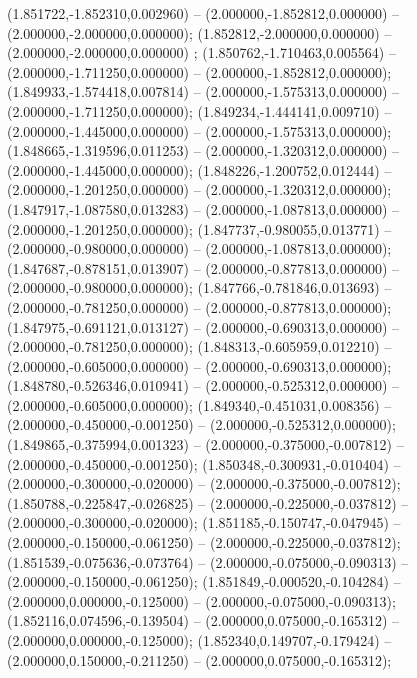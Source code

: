  (1.851722,-1.852310,0.002960) -- (2.000000,-1.852812,0.000000) -- (2.000000,-2.000000,0.000000);
 (1.852812,-2.000000,0.000000) -- (2.000000,-2.000000,0.000000) ;
 (1.850762,-1.710463,0.005564) -- (2.000000,-1.711250,0.000000) -- (2.000000,-1.852812,0.000000);
 (1.849933,-1.574418,0.007814) -- (2.000000,-1.575313,0.000000) -- (2.000000,-1.711250,0.000000);
 (1.849234,-1.444141,0.009710) -- (2.000000,-1.445000,0.000000) -- (2.000000,-1.575313,0.000000);
 (1.848665,-1.319596,0.011253) -- (2.000000,-1.320312,0.000000) -- (2.000000,-1.445000,0.000000);
 (1.848226,-1.200752,0.012444) -- (2.000000,-1.201250,0.000000) -- (2.000000,-1.320312,0.000000);
 (1.847917,-1.087580,0.013283) -- (2.000000,-1.087813,0.000000) -- (2.000000,-1.201250,0.000000);
 (1.847737,-0.980055,0.013771) -- (2.000000,-0.980000,0.000000) -- (2.000000,-1.087813,0.000000);
 (1.847687,-0.878151,0.013907) -- (2.000000,-0.877813,0.000000) -- (2.000000,-0.980000,0.000000);
 (1.847766,-0.781846,0.013693) -- (2.000000,-0.781250,0.000000) -- (2.000000,-0.877813,0.000000);
 (1.847975,-0.691121,0.013127) -- (2.000000,-0.690313,0.000000) -- (2.000000,-0.781250,0.000000);
 (1.848313,-0.605959,0.012210) -- (2.000000,-0.605000,0.000000) -- (2.000000,-0.690313,0.000000);
 (1.848780,-0.526346,0.010941) -- (2.000000,-0.525312,0.000000) -- (2.000000,-0.605000,0.000000);
 (1.849340,-0.451031,0.008356) -- (2.000000,-0.450000,-0.001250) -- (2.000000,-0.525312,0.000000);
 (1.849865,-0.375994,0.001323) -- (2.000000,-0.375000,-0.007812) -- (2.000000,-0.450000,-0.001250);
 (1.850348,-0.300931,-0.010404) -- (2.000000,-0.300000,-0.020000) -- (2.000000,-0.375000,-0.007812);
 (1.850788,-0.225847,-0.026825) -- (2.000000,-0.225000,-0.037812) -- (2.000000,-0.300000,-0.020000);
 (1.851185,-0.150747,-0.047945) -- (2.000000,-0.150000,-0.061250) -- (2.000000,-0.225000,-0.037812);
 (1.851539,-0.075636,-0.073764) -- (2.000000,-0.075000,-0.090313) -- (2.000000,-0.150000,-0.061250);
 (1.851849,-0.000520,-0.104284) -- (2.000000,0.000000,-0.125000) -- (2.000000,-0.075000,-0.090313);
 (1.852116,0.074596,-0.139504) -- (2.000000,0.075000,-0.165312) -- (2.000000,0.000000,-0.125000);
 (1.852340,0.149707,-0.179424) -- (2.000000,0.150000,-0.211250) -- (2.000000,0.075000,-0.165312);
